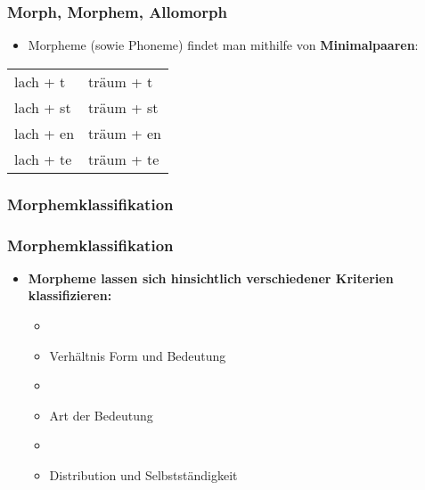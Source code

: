 \begin{frame}
\frametitle{Morph, Morphem, Allomorph}

\begin{itemize}
	\item Morpheme (sowie Phoneme) findet man mithilfe von \textbf{Minimalpaaren}:
\end{itemize}

\begin{table}
\begin{tabular}{l | l}
lach + t  & träum + t \\
lach + st & träum + st \\
lach + en & träum + en \\
lach + te & träum + te \\
\end{tabular}
\end{table}

\end{frame}


\subsubsection{Morphemklassifikation}


\begin{frame}
\frametitle{Morphemklassifikation}

\begin{itemize}
	\item \textbf{Morpheme lassen sich hinsichtlich verschiedener Kriterien klassifizieren:}
	
	\begin{itemize}
	 \item[]
	 \item Verhältnis Form und Bedeutung
	 \item[]
	 \item Art der Bedeutung
	 \item[]
	 \item Distribution und Selbstständigkeit
	\end{itemize}
\end{itemize}


\end{frame}



